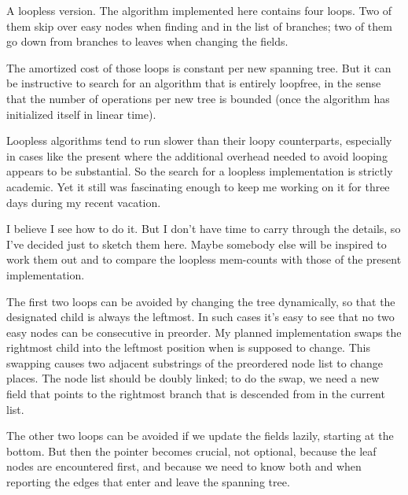 A loopless version. The algorithm implemented here
contains four
loops. Two of them skip over easy nodes when finding  and 
in the list of branches; two of them go down from branches to leaves
when changing the  fields.

The amortized cost of those loops is constant per new spanning tree.
But it can be instructive to search for an algorithm that is entirely
loopfree, in the sense that the number of operations per new tree
is bounded (once the algorithm has initialized itself in linear time).

Loopless algorithms tend to run slower than their loopy counterparts,
especially in cases like the present where the additional overhead
needed to avoid looping appears to be substantial. So the search
for a loopless implementation is strictly academic. Yet it still
was fascinating enough to keep me working on it for three days
during my recent vacation.

I believe I see how to do it. But I don't have time to carry through
the details, so I've decided just to sketch them here. Maybe somebody
else will be inspired to work them out and to compare the
loopless mem-counts with those of the present implementation.

The first two loops can be avoided by changing the tree dynamically,
so that the designated child is always the leftmost. In such cases
it's easy to see that no two easy nodes can be consecutive in preorder.
My planned implementation swaps the rightmost child into the leftmost
position when  is supposed to change. This swapping causes
two
adjacent substrings of the preordered node list to change places.
The node list should be doubly linked;
to do the swap, we need a new field  that points to the
rightmost branch that is descended from  in the current list.

The other two loops can be avoided if we update the  fields lazily,
starting at the bottom.  But then the pointer  becomes
crucial, not optional, because the leaf nodes are encountered first,
and because we need to know both  and  when
reporting the edges that enter and leave the spanning tree.

